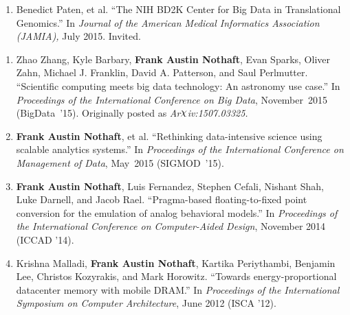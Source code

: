 \documentclass[10pt]{article} %
\newcounter{pubCtr}
\begin{document}
\begin {minipage}[t]{0.2\linewidth}
\vspace{0pt}
\end {minipage}
\begin {minipage}[t]{0.8\linewidth}
\vspace{0pt}


\setdefaultleftmargin{13pt}{}{}{}{}{}
\begin{enumerate}
\item Benedict Paten, et al. ``The NIH BD2K Center for Big Data in Translational Genomics.''
In \emph{Journal of the American Medical Informatics Association (JAMIA),} July 2015. Invited.
\setcounter{pubCtr}{\theenumi}
\end{enumerate}


\begin{enumerate}
\setcounter{enumi}{\thepubCtr}
\item {Zhao Zhang, Kyle Barbary, \textbf{Frank Austin Nothaft}, Evan Sparks, Oliver Zahn,
Michael J. Franklin, David A. Patterson, and Saul Perlmutter. ``Scientific computing meets big data
technology: An astronomy use case.'' In \emph{Proceedings of the International Conference on
Big Data}, November~2015 (BigData~'15). Originally posted as \emph{Ar$\raisebox{2pt}{$\chi$}$iv:1507.03325.}}
\item {\textbf{Frank Austin Nothaft}, et al. ``Rethinking data-intensive science using scalable
analytics systems.'' In \emph{Proceedings of the International Conference on Management of
Data}, May~2015 (SIGMOD~'15).}
\item {\textbf{Frank Austin Nothaft}, Luis Fernandez, Stephen Cefali, Nishant Shah, Luke Darnell,
and Jacob Rael. ``Pragma-based floating-to-fixed point conversion for the emulation of analog
behavioral models.'' In \emph{Proceedings of the International Conference on Computer-Aided Design},
November 2014 (ICCAD '14).}
\item {Krishna Malladi, \textbf{Frank Austin Nothaft}, Kartika Periythambi, Benjamin Lee, 
Christos Kozyrakis, and Mark Horowitz. ``Towards energy-proportional datacenter memory with mobile DRAM.''
In \emph{Proceedings of the International Symposium on Computer Architecture}, June 2012 (ISCA '12).}
\setcounter{pubCtr}{\theenumi}
\end{enumerate}


\end{minipage}
\end{document}
